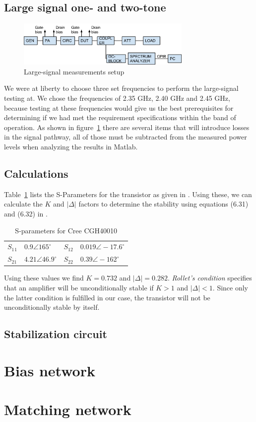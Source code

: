   \subsection{Large signal one- and two-tone}
    \begin{figure}[h]
	  \centering
	  \includegraphics[width=0.75\textwidth]{img/Large_signal_meas}
	  \caption{Large-signal measurements setup}
	  \label{fig:fig_large_meas}
    \end{figure}
	We were at liberty to choose three set frequencies to perform the large-signal testing at. We chose the frequencies of 2.35 GHz, 2.40 GHz and 2.45 GHz, because testing at these frequencies would give us the best prerequisites for determining if we had met the requirement specifications within the band of operation. As shown in figure~\ref{fig:fig_large_meas} there are several items that will introduce losses in the signal pathway, all of those must be subtracted from the measured power levels when analyzing the results in Matlab.

  \subsection{Calculations}
  Table~\ref{tab:cree_sparm} lists the S-Parameters for the transistor as given in \cite{CreeDS}. Using these, we can calculate the $K$ and $\lvert \Delta \rvert$ factors to determine the stability using equations (6.31) and (6.32) in \cite{Pozar}.
  \begin{table}[h]
	  \centering
  \begin{tabular}{l l l l}
	  $S_1$$_1$ & $0.9 \angle 165^{\circ}$ & $S_{12}$ & $0.019 \angle -17.6^{\circ}$ \\
	  $S_{21}$ & $4.21 \angle 46.9^{\circ}$ & $S_{22}$ & $0.39 \angle -162^{\circ}$ \\
  \end{tabular}
	  \caption{S-parameters for Cree CGH40010}
	  \label{tab:cree_sparm}

  \end{table}

  Using these values we find $K = 0.732$ and $\lvert \Delta \rvert = 0.282$. \emph{Rollet's condition} specifies that an amplifier will be unconditionally stable if $K > 1$ and $\lvert \Delta \rvert < 1$. Since only the latter condition is fulfilled in our case, the transistor will not be unconditionally stable by itself.

  \subsection{Stabilization circuit}
  



  \section{Bias network}

  



  \section{Matching network}
  
